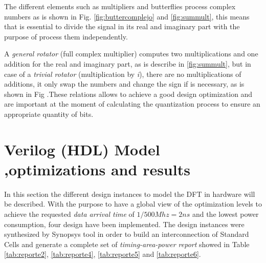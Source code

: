 \documentclass[10pt,times,mathptm,psfig,final,journal,comsoc]{IEEEtran}
\begin{document}
The different elements such as multipliers and butterflies process complex numbers as is shown in Fig. \ref{fig:buttercomplejo} and \ref{fig:summult}, this means that
is essential to divide the signal in its real and imaginary part with the purpose of process them independently.

A \textit{general rotator} (full complex multiplier) computes two multiplications and one addition for the real and imaginary part, as is describe in \ref{fig:summult}, but in case of a \textit{trivial rotator} (multiplication by  \textit{i}), there are no multiplications of additions, it only swap the numbers and change the sign if is necessary, as is shown in Fig .These relations allows to achieve a good design optimization and are important at the moment of calculating the quantization process to ensure an appropriate quantity of bits.



\section{Verilog (HDL) Model ,optimizations and results}  \label{sec:results}

In this section the different design instances to model the DFT in hardware will be described. With the purpose to have a global view of the optimization levels to achieve the requested \textit{data arrival time} of $1/500Mhz=2ns$ and the lowest power consumption, four design have been implemented. The design instances were synthesized by Synopsys tool in order to build an interconnection of Standard Cells and generate a complete set of \textit{timing-area-power report} showed in Table \ref{tab:reporte2}, \ref{tab:reporte4}, \ref{tab:reporte5} and  \ref{tab:reporte6}.
\end{document}
